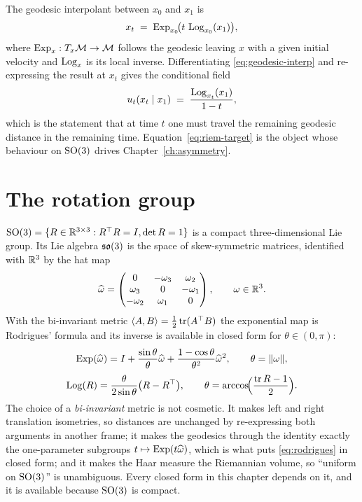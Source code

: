 The geodesic interpolant between $x_0$ and $x_1$ is
\begin{equation}
  x_t \;=\; \operatorname{Exp}_{x_0}\!\bigl(t \,\operatorname{Log}_{x_0}(x_1)\bigr),
  \label{eq:geodesic-interp}
\end{equation}
where $\operatorname{Exp}_x : T_x\mathcal{M} \to \mathcal{M}$ follows the geodesic leaving $x$ with a
given initial velocity and $\operatorname{Log}_x$ is its local inverse. Differentiating
\eqref{eq:geodesic-interp} and re-expressing the result at $x_t$ gives the
conditional field
\begin{equation}
  u_t(x_t \mid x_1) \;=\; \frac{\operatorname{Log}_{x_t}(x_1)}{1-t} ,
  \label{eq:riem-target}
\end{equation}
which is the statement that at time $t$ one must travel the remaining geodesic
distance in the remaining time. Equation~\eqref{eq:riem-target} is the object
whose behaviour on $\mathrm{SO}(3)$ drives Chapter~\ref{ch:asymmetry}.

\section{The rotation group}
\label{sec:so3}

$\mathrm{SO}(3) = \{R \in \mathbb{R}^{3\times 3} : R^\top R = I, \det R = 1\}$
is a compact three-dimensional Lie group. Its Lie algebra $\mathfrak{so}(3)$ is the
space of skew-symmetric matrices, identified with $\mathbb{R}^3$ by the hat map
\begin{equation}
  \widehat{\omega} =
  \begin{pmatrix} 0 & -\omega_3 & \omega_2\\
                  \omega_3 & 0 & -\omega_1\\
                  -\omega_2 & \omega_1 & 0 \end{pmatrix},
  \qquad \omega \in \mathbb{R}^3 .
\end{equation}
With the bi-invariant metric $\langle A, B\rangle = \tfrac12\operatorname{tr}(A^\top B)$ the
exponential map is Rodrigues' formula and its inverse is available in closed
form for $\theta \in (0,\pi)$:
\begin{equation}
  \operatorname{Exp}(\widehat{\omega}) = I + \frac{\sin\theta}{\theta}\widehat{\omega}
    + \frac{1-\cos\theta}{\theta^2}\widehat{\omega}^2,
  \qquad
  \theta = \|\omega\| ,
  \label{eq:rodrigues}
\end{equation}
\begin{equation}
  \operatorname{Log}(R) = \frac{\theta}{2\sin\theta}\bigl(R - R^\top\bigr),
  \qquad
  \theta = \arccos\!\Bigl(\frac{\operatorname{tr} R - 1}{2}\Bigr) .
  \label{eq:so3-log}
\end{equation}
The choice of a \emph{bi-invariant} metric is not cosmetic. It makes left and
right translation isometries, so distances are unchanged by re-expressing both
arguments in another frame; it makes the geodesics through the identity
exactly the one-parameter subgroups $t \mapsto \operatorname{Exp}(t\widehat{\omega})$, which is
what puts \eqref{eq:rodrigues} in closed form; and it makes the Haar measure
the Riemannian volume, so ``uniform on $\mathrm{SO}(3)$'' is unambiguous. Every
closed form in this chapter depends on it, and it is available because
$\mathrm{SO}(3)$ is compact.

